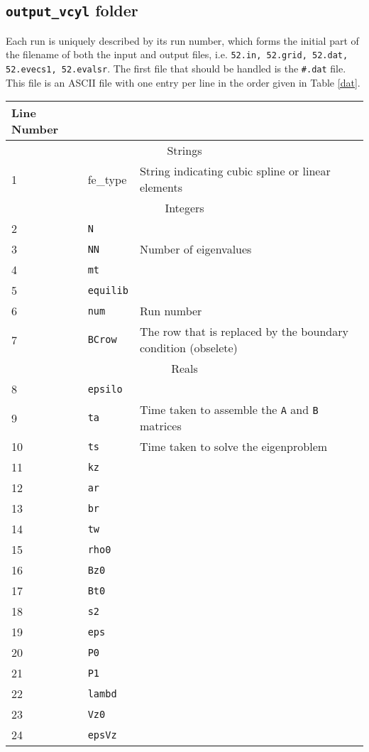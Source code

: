 \documentclass[letterpaper]{article}
\newcommand{\ttt}[1]{\texttt{#1}}
\begin{document}
\subsection{\ttt{output\_vcyl} folder}
Each run is uniquely described by its run number, which forms the initial part of the filename of both the input and output files, i.e. \ttt{52.in, 52.grid, 52.dat, 52.evecs1, 52.evalsr}.  The first file that should be handled is the \ttt{\#.dat} file. This file is an ASCII file with one entry per line in the order given in Table \ref{dat}.
\begin{table}
\begin{tabular}{|l|l|p{2.9in}|}
\cline{1-1}
\multicolumn{1}{|l|}{Line Number}\\
\hline
\hline
\multicolumn{3}{|c|}{Strings} \\
\hline
1& fe\_type & String indicating cubic spline or linear elements \\
\hline
\hline
\multicolumn{3}{|c|}{Integers} \\
\hline
2&\ttt{N} & \\
3&\ttt{NN} & Number of eigenvalues \\
4&\ttt{mt} & \\
5&\ttt{equilib} & \\
6&\ttt{num} & Run number \\
7&\ttt{BCrow} & The row that is replaced by the boundary condition (obselete)\\
\hline
\hline
\multicolumn{3}{|c|}{Reals} \\
\hline
8&\ttt{epsilo} & \\
9&\ttt{ta} & Time taken to assemble the \ttt{A} and \ttt{B} matrices \\
10&\ttt{ts} & Time taken to solve the eigenproblem \\
11&\ttt{kz} & \\
12&\ttt{ar} & \\
13&\ttt{br} & \\
14&\ttt{tw} & \\
15&\ttt{rho0} & \\
16&\ttt{Bz0} & \\
17&\ttt{Bt0} & \\
18&\ttt{s2} &  \\
19&\ttt{eps} & \\
20&\ttt{P0} & \\
21&\ttt{P1} & \\
22&\ttt{lambd} & \\
23&\ttt{Vz0} & \\
24&\ttt{epsVz} & \\

\end{tabular}
\end{table}
\end{document}

